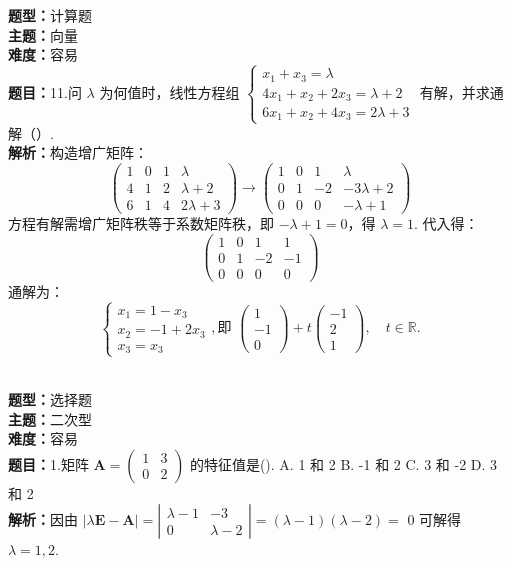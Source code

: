 \documentclass{ctexart}
\newenvironment{question}[5]{%
	\noindent\textbf{题型：}#1\\
	\textbf{主题：}#2\\
	\textbf{难度：}#3\\
	\textbf{题目：}#4\\
	\textbf{解析：}#5\\
	\vspace{1em}
}{}
\begin{document}
	\begin{question}
		{计算题}
		{向量}
		{容易}
		{11.问 \(\lambda\) 为何值时，线性方程组 \(\left\{\begin{array}{l}x_1+x_3=\lambda \\ 4x_1+x_2+2x_3=\lambda+2 \\ 6x_1+x_2+4x_3=2\lambda+3\end{array}\right.\) 有解，并求通解（）. }
		{构造增广矩阵：
			\[
			\left(\begin{array}{ccc|c}
				1 & 0 & 1 & \lambda \\
				4 & 1 & 2 & \lambda+2 \\
				6 & 1 & 4 & 2\lambda+3
			\end{array}\right) \rightarrow \left(\begin{array}{ccc|c}
				1 & 0 & 1 & \lambda \\
				0 & 1 & -2 & -3\lambda+2 \\
				0 & 0 & 0 & -\lambda+1
			\end{array}\right)
			\]
			方程有解需增广矩阵秩等于系数矩阵秩，即 \(-\lambda+1=0\)，得 \(\lambda=1\). 代入得：
			\[
			\left(\begin{array}{ccc|c}
				1 & 0 & 1 & 1 \\
				0 & 1 & -2 & -1 \\
				0 & 0 & 0 & 0
			\end{array}\right)
			\]
			通解为：
			\[
			\left\{
			\begin{array}{l}
				x_1 = 1 - x_3 \\
				x_2 = -1 + 2x_3 \\
				x_3 = x_3
			\end{array}
			\right., \text{即 } \left(\begin{array}{c}1\\-1\\0\end{array}\right) + t\left(\begin{array}{c}-1\\2\\1\end{array}\right), \quad t \in \mathbb{R}.
			\]
		}
	\end{question}
	
	
		
	
	\begin{question}
		{选择题}
		{二次型}
		{容易}
		{1.矩阵 \(\mathbf{A}=\left(\begin{array}{ll}1 & 3 \\ 0 & 2\end{array}\right)\) 的特征值是(\qquad). 
			A. 1 和 2
			B. -1 和 2
			C. 3 和 -2
			D. 3 和 2}
		{因由 \(|\lambda \mathbf{E}-\mathbf{A}|=\left|\begin{array}{cc}\lambda-1 & -3 \\ 0 & \lambda-2\end{array}\right|=(\lambda-1)(\lambda-2)=\) 0 可解得 \(\lambda=1,2\). }
	\end{question}
	
\end{document}
